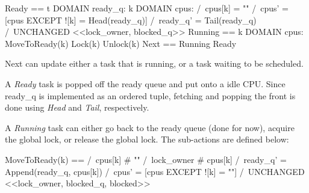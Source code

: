 \begin{tla}
Ready == 
    \E t \in DOMAIN ready_q:
        \E k \in DOMAIN cpus:
        /\ cpus[k] = "" 
        /\ cpus' = [cpus EXCEPT ![k] = Head(ready_q)]
        /\ ready_q' = Tail(ready_q)
        /\ UNCHANGED <<lock_owner, blocked_q>>
Running == 
    \E k \in DOMAIN cpus:
        \/ MoveToReady(k)
        \/ Lock(k)
        \/ Unlock(k)
Next == 
    \/ Running
    \/ Ready
\end{tla}
\begin{tlatex}
%
%
%
%
%
%
%
%
%
%
%
%
%
\end{tlatex}
\newline

Next can update either a task that is running, or a task waiting to be
scheduled.\newline

A \textit{Ready} task is popped off the ready queue and put onto a idle CPU.
Since ready\_q is implemented as an ordered tuple, fetching and popping the
front is done using \textit{Head} and \textit{Tail}, respectively.\newline

A \textit{Running} task can either go back to the ready queue (done for now),
acquire the global lock, or release the global lock.  The sub-actions are
defined below:\newline

\begin{tla}
MoveToReady(k) == 
    /\ cpus[k] # "" 
    /\ lock_owner # cpus[k]
    /\ ready_q' = Append(ready_q, cpus[k]) 
    /\ cpus' = [cpus EXCEPT ![k] = ""]
    /\ UNCHANGED <<lock_owner, blocked_q, blocked>>
\end{tla}
\begin{tlatex}
%
%
%
\end{tlatex}
\newline

